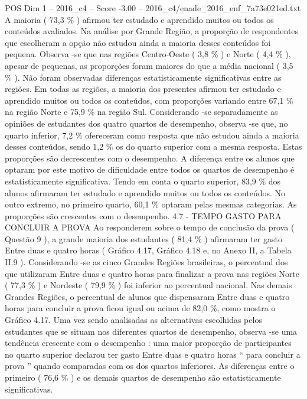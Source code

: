 \begin{textsample}{POS Dim 1 – 2016\_c4 – Score -3.00 – 2016\_c4/enade\_2016\_enf\_7a73e021ed.txt}
A maioria ( 73,3 \% ) afirmou ter estudado e aprendido muitos ou todos os conteúdos avaliados.
Na análise por Grande Região, a proporção de respondentes que escolheram a opção não estudou ainda a maioria desses conteúdos foi pequena.
Observa -se que nas regiões Centro-Oeste ( 3,8 \% ) e Norte ( 4,4 \% ), apesar de pequenas, as proporções foram maiores do que a média nacional ( 3,5 \% ).
Não foram observadas diferenças estatisticamente significativas entre as regiões.
Em todas as regiões, a maioria dos presentes afirmou ter estudado e aprendido muitos ou todos os conteúdos, com proporções variando entre 67,1 \% na região Norte e 75,9 \% na região Sul.
Considerando -se separadamente as opiniões de estudantes dos quatro quartos de desempenho, observa -se que, no quarto inferior, 7,2 \% ofereceram como resposta que não estudou ainda a maioria desses conteúdos, sendo 1,2 \% os do quarto superior com a mesma resposta.
Estas proporções são decrescentes com o desempenho.
A diferença entre os alunos que optaram por este motivo de dificuldade entre todos os quartos de desempenho é estatisticamente significativa.
Tendo em conta o quarto superior, 83,9 \% dos alunos afirmaram ter estudado e aprendido muitos ou todos os conteúdos.
No outro extremo, no primeiro quarto, 60,1 \% optaram pelas mesmas categorias.
As proporções são crescentes com o desempenho. 4.7 - TEMPO GASTO PARA CONCLUIR A PROVA Ao responderem sobre o tempo de conclusão da prova ( Questão 9 ), a grande maioria dos estudantes ( 81,4 \% ) afirmaram ter gasto Entre duas e quatro horas ( Gráfico 4.17, Gráfico 4.18 e, no Anexo II, a Tabela II.9 ).
Considerando -se as cinco Grandes Regiões brasileiras, o percentual dos que utilizaram Entre duas e quatro horas para finalizar a prova nas regiões Norte ( 77,3 \% ) e Nordeste ( 79,9 \% ) foi inferior ao percentual nacional.
Nas demais Grandes Regiões, o percentual de alunos que dispensaram Entre duas e quatro horas para concluir a prova ficou igual ou acima de 82,0 \%, como mostra o Gráfico 4.17.
Uma vez sendo analisadas as alternativas escolhidas pelos estudantes que se situam nos diferentes quartos de desempenho, observa -se uma tendência crescente com o desempenho : uma maior proporção de participantes no quarto superior declarou ter gasto Entre duas e quatro horas “ para concluir a prova ” quando comparadas com os dos quartos inferiores.
As diferenças entre o primeiro ( 76,6 \% ) e os demais quartos de desempenho são estatisticamente significativas.

\end{textsample}
